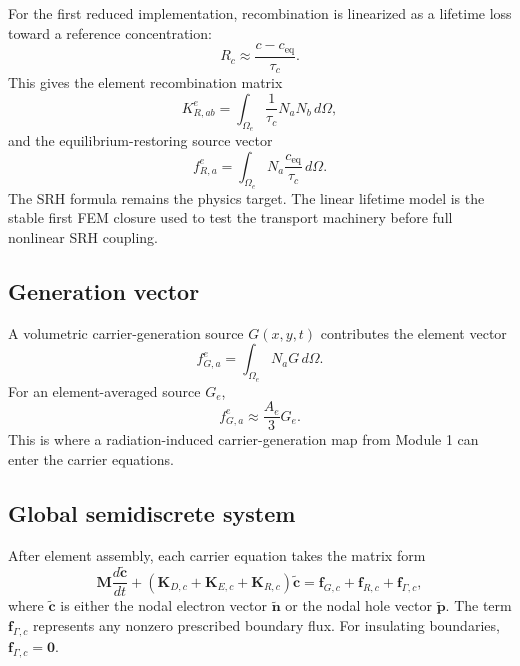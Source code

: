 \documentclass[11pt]{article}
\begin{document}
For the first reduced implementation, recombination is linearized as a lifetime loss toward a reference concentration:
\begin{equation}
    R_c\approx \frac{c-c_{\mathrm{eq}}}{\tau_c}.
\end{equation}
This gives the element recombination matrix
\begin{equation}
    K^e_{R,ab}=\int_{\Omega_e}\frac{1}{\tau_c}N_aN_b\,d\Omega,
\end{equation}
and the equilibrium-restoring source vector
\begin{equation}
    f^e_{R,a}=\int_{\Omega_e}N_a\frac{c_{\mathrm{eq}}}{\tau_c}\,d\Omega.
\end{equation}
The SRH formula remains the physics target. The linear lifetime model is the stable first FEM closure used to test the transport machinery before full nonlinear SRH coupling.

\subsection{Generation vector}

A volumetric carrier-generation source \(G(x,y,t)\) contributes the element vector
\begin{equation}
    f^e_{G,a}=\int_{\Omega_e}N_aG\,d\Omega.
\end{equation}
For an element-averaged source \(G_e\),
\begin{equation}
    f^e_{G,a}\approx \frac{A_e}{3}G_e.
\end{equation}
This is where a radiation-induced carrier-generation map from Module 1 can enter the carrier equations.

\subsection{Global semidiscrete system}

After element assembly, each carrier equation takes the matrix form
\begin{equation}
    \mathbf{M}\frac{d\tilde{\mathbf{c}}}{dt}
    +\left(\mathbf{K}_{D,c}+\mathbf{K}_{E,c}+\mathbf{K}_{R,c}\right)\tilde{\mathbf{c}}
    =\mathbf{f}_{G,c}+\mathbf{f}_{R,c}+\mathbf{f}_{\Gamma,c},
    \label{eq:m5_semidiscrete}
\end{equation}
where \(\tilde{\mathbf{c}}\) is either the nodal electron vector \(\tilde{\mathbf{n}}\) or the nodal hole vector \(\tilde{\mathbf{p}}\). The term \(\mathbf{f}_{\Gamma,c}\) represents any nonzero prescribed boundary flux. For insulating boundaries, \(\mathbf{f}_{\Gamma,c}=\mathbf{0}\).
\end{document}
